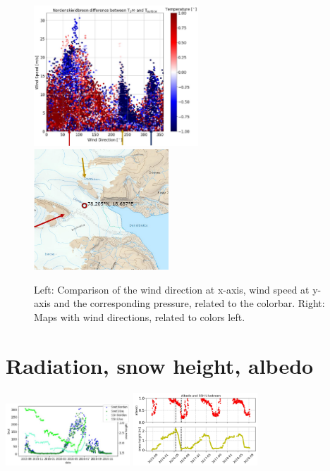 \documentclass[11pt]{report}
\begin{document}
\begin{figure}[h]
\includegraphics[scale=1, width=0.55\textwidth]{ulve-WS-WD.jpg}
\includegraphics[scale=1, width=0.45\textwidth]{ulve-WS-WD-rose-1.jpg}
\caption{Left: Comparison of the wind direction at x-axis, wind speed at y-axis and the corresponding pressure, related to the colorbar. Right: Maps with wind directions, related to colors left.}
\label{fig:PRulve}
\end{figure}


\newpage
\section{Radiation, snow height, albedo}\label{sec:rad}
\includegraphics[scale=1, width=0.35\textwidth]{Picture1.jpg}
\includegraphics[scale=1, width=0.35\textwidth]{Picture2.jpg}
\end{document}
